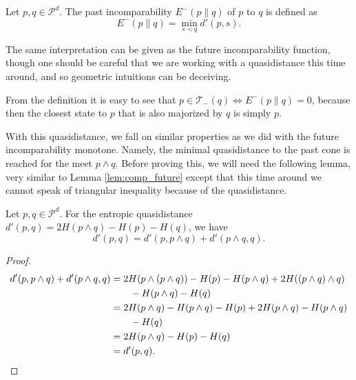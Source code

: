 \begin{definition}
    Let $p, q \in \mathcal{P}^d$. The past incomparability $E^-(p \parallel q)$ of $p$ to $q$ is defined as
    \begin{equation}
        E^- (p \parallel q) = \min_{s \prec q} d'(p, s).
    \end{equation}
\end{definition}

The same interpretation can be given as the future incomparability function, though one should be careful that we are working with a quasidistance this time around, and so geometric intuitions can be deceiving.

\begin{remark}
    From the definition it is easy to see that $p \in \mathcal{T}_-(q) \iff E^-(p \parallel q) = 0$, because then the closest state to $p$ that is also majorized by $q$ is simply $p$.
\end{remark}

With this quasidistance, we fall on similar properties as we did with the future incomparability monotone. Namely, the minimal quasidistance to the past cone is reached for the meet $p \wedge q$. Before proving this, we will need the following lemma, very similar to Lemma \ref{lem:comp_future} except that this time around we cannot speak of triangular inequality because of the quasidistance.

\begin{lemma} \label{lem:comp_past}
    Let $p, q \in \mathcal{P}^d$. For the entropic quasidistance $d'(p, q) = 2H(p \wedge q) - H(p) - H(q)$, we have
    \begin{equation}
        d'(p, q) = d'(p, p \wedge q) + d'(p \wedge q, q).
    \end{equation}
\end{lemma}

\begin{proof}
    \begin{align}
        d'(p, p \wedge q) + d'(p \wedge q, q) &= 2H(p \wedge (p \wedge q)) - H(p) - H(p \wedge q) + 2H((p \wedge q) \wedge q) \nonumber\\
        &\quad \quad - H(p \wedge q) - H(q)\\
        &= 2H(p \wedge q) - H(p \wedge q) - H(p) + 2H(p \wedge q) - H(p \wedge q)\nonumber\\
        &\quad \quad - H(q) \\
        &= 2H(p \wedge q) - H(p) - H(q) \\
        &= d'(p, q). \qedhere
    \end{align} 
\end{proof}


